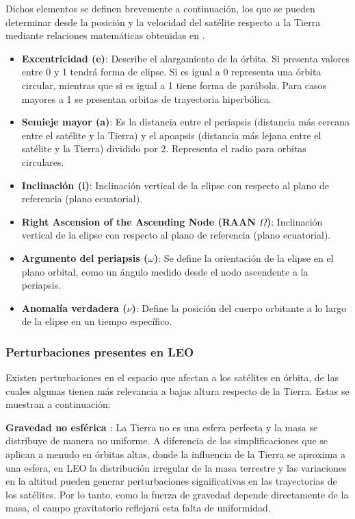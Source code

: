 Dichos elementos se definen brevemente a continuación, los que se pueden determinar desde la posición y la velocidad del satélite respecto a la Tierra mediante relaciones matemáticas obtenidas en \cite{ref22}.


\begin{itemize}
	\item \textbf{Excentricidad (e)}: Describe el alargamiento de la órbita. Si presenta valores entre 0 y 1 tendrá forma de elipse. Si es igual a 0 representa una órbita circular, mientras que si es igual a 1 tiene forma de parábola. Para casos mayores a 1 se presentan orbitas de trayectoria hiperbólica.
	
	\item \textbf{Semieje mayor (a)}: Es la distancia entre el periapsis (distancia más cercana entre el satélite y la Tierra) y el apoapsis (distancia más lejana entre el satélite y la Tierra) dividido por 2. Representa el radio para orbitas circulares.
	
	\item \textbf{Inclinación (i)}: Inclinación vertical de la elipse con respecto al plano de referencia (plano ecuatorial).
	
	\item \textbf{Right Ascension of the Ascending Node (RAAN $\Omega$)}: Inclinación vertical de la elipse con respecto al plano de referencia (plano ecuatorial).	
	
	\item \textbf{Argumento del periapsis ($\omega$)}: Se define la orientación de la elipse en el plano orbital, como un ángulo medido desde el nodo ascendente a la periapsis.
	
	\item \textbf{Anomalía verdadera  ($\nu$)}: Define la posición del cuerpo orbitante a lo largo de la elipse en un tiempo específico.
\end{itemize}

\subsubsection{Perturbaciones presentes en LEO}

Existen perturbaciones en el espacio que afectan a los satélites en órbita, de las cuales algunas tienen más relevancia a bajas altura respecto de la Tierra. Estas se muestran a continuación:

\textbf{Gravedad no esférica \cite{ref25}}: La Tierra no es una esfera perfecta y la masa se distribuye de manera no uniforme. A diferencia de las simplificaciones que se aplican a menudo en órbitas altas, donde la influencia de la Tierra se aproxima a una esfera, en LEO la distribución irregular de la masa terrestre y las variaciones en la altitud pueden generar perturbaciones significativas en las trayectorias de los satélites. Por lo tanto, como la fuerza de gravedad depende directamente de la masa, el campo gravitatorio reflejará esta falta de uniformidad.


